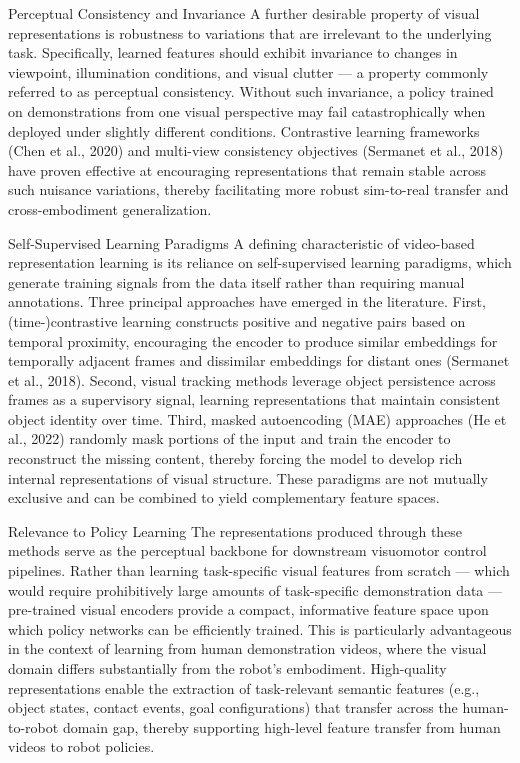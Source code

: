 Perceptual Consistency and Invariance
A further desirable property of visual representations is robustness to variations that are irrelevant to the underlying task. Specifically, learned features should exhibit invariance to changes in viewpoint, illumination conditions, and visual clutter — a property commonly referred to as perceptual consistency. Without such invariance, a policy trained on demonstrations from one visual perspective may fail catastrophically when deployed under slightly different conditions. Contrastive learning frameworks (Chen et al., 2020) and multi-view consistency objectives (Sermanet et al., 2018) have proven effective at encouraging representations that remain stable across such nuisance variations, thereby facilitating more robust sim-to-real transfer and cross-embodiment generalization.

Self-Supervised Learning Paradigms
A defining characteristic of video-based representation learning is its reliance on self-supervised learning paradigms, which generate training signals from the data itself rather than requiring manual annotations. Three principal approaches have emerged in the literature. First, (time-)contrastive learning constructs positive and negative pairs based on temporal proximity, encouraging the encoder to produce similar embeddings for temporally adjacent frames and dissimilar embeddings for distant ones (Sermanet et al., 2018). Second, visual tracking methods leverage object persistence across frames as a supervisory signal, learning representations that maintain consistent object identity over time. Third, masked autoencoding (MAE) approaches (He et al., 2022) randomly mask portions of the input and train the encoder to reconstruct the missing content, thereby forcing the model to develop rich internal representations of visual structure. These paradigms are not mutually exclusive and can be combined to yield complementary feature spaces.

Relevance to Policy Learning
The representations produced through these methods serve as the perceptual backbone for downstream visuomotor control pipelines. Rather than learning task-specific visual features from scratch — which would require prohibitively large amounts of task-specific demonstration data — pre-trained visual encoders provide a compact, informative feature space upon which policy networks can be efficiently trained. This is particularly advantageous in the context of learning from human demonstration videos, where the visual domain differs substantially from the robot's embodiment. High-quality representations enable the extraction of task-relevant semantic features (e.g., object states, contact events, goal configurations) that transfer across the human-to-robot domain gap, thereby supporting high-level feature transfer from human videos to robot policies.

